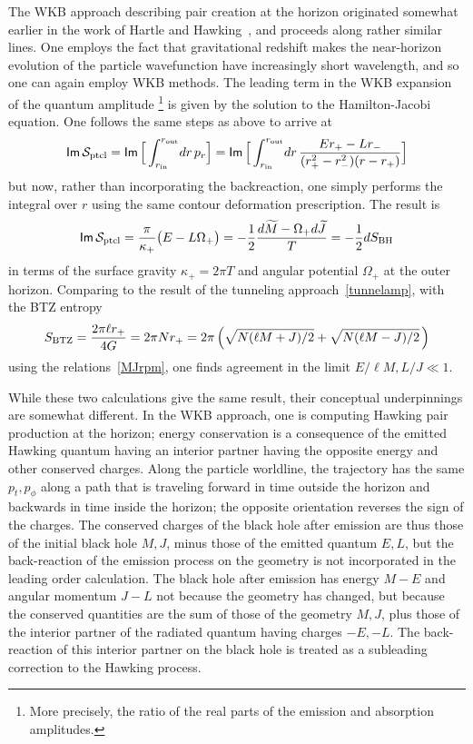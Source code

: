 \documentclass[11pt]{article}
\newcommand{\rcite}{\cite}
\def\Mtil{{\widetilde M}}
\def\Jtil{{\widetilde J}}
\def\ptcl{{\rm ptcl}}
\def\BH{{\rm BH}}
\def\BTZ{{\rm BTZ}}
\def\sfI{{\mathsf I}}
\def\sfm{{\mathsf m}}
\def\half{\frac12}
\def\Im{{\sfI\sfm\,}}
\def\be{\begin{equation}}
\def\ee{\end{equation}}
\numberwithin{equation}{section}
\def\cS{\mathcal {S}} \def\cT{\mathcal {T}} \def\cU{\mathcal {U}}
\def\half{\frac12}
\begin{document}
The WKB approach describing pair creation at the horizon originated somewhat earlier in the work of Hartle and Hawking~\rcite{Hartle:1976tp}, and proceeds along rather similar lines.  One employs the fact that gravitational redshift makes the near-horizon evolution of the particle wavefunction have increasingly short wavelength, and so one can again employ WKB methods.  The leading term in the WKB expansion of the quantum amplitude%
\footnote{More precisely, the ratio of the real parts of the emission and absorption amplitudes.} 
is given by the solution to the Hamilton-Jacobi equation.
One follows the same steps as above to arrive at
\be
\label{ImSagain}
\Im \cS_\ptcl = \Im \Big[ \int_{r_{\rm in}}^{r_{\rm out}} \! dr \, p_r  \Big] 
= \Im \Big[\int_{r_{\rm in}}^{r_{\rm out}} \! dr \, \frac{E  r_+ - L  r_- }{(r_+^2-r_-^2)(r-r_+)}  \Big] 
\ee
but now, rather than incorporating the backreaction, one simply performs the integral over $r$ using the same contour deformation prescription.  The result is
\be
\label{ImSptclWKB}
\Im \cS_\ptcl = \frac{\pi}{\kappa_+}\big( E  - L \Omega_+\big) = -\half\frac{d \Mtil -\Omega_+ d \Jtil }{T}  =  -\half  {d S_\BH} 
\ee
in terms of the surface gravity $\kappa_+=2\pi T$ and angular potential $\Omega_+$ at the outer horizon.
Comparing to the result of the tunneling approach~\eqref{tunnelamp}, with the BTZ entropy
\be
\label{BTZent}
S_\BTZ = \frac{2\pi \ell r_+}{4G} = 2\pi N r_+ = 2\pi\left( \sqrt{N(\ell M+J)/2} + \sqrt{ N (\ell M-J)/2} \, \right)  
\ee
using the relations~\eqref{MJrpm}, one finds agreement in the limit ${E }/{\ell M},{L }/{J}\ll1$.

While these two calculations give the same result, their conceptual underpinnings are somewhat different.  In the WKB approach, one is computing Hawking pair production at the horizon; energy conservation is a consequence of the emitted Hawking quantum having an interior partner having the opposite energy and other conserved charges.  Along the particle worldline, the trajectory has the same $p_t,p_\phi$ along a path that is traveling forward in time outside the horizon and backwards in time inside the horizon; the opposite orientation reverses the sign of the charges.  The conserved charges of the black hole after emission are thus those of the initial black hole $M,J$, minus those of the emitted quantum $E ,L $, but the back-reaction of the emission process on the geometry is not incorporated in the leading order calculation.  The black hole after emission has energy $M-E $ and angular momentum $J-L $ not because the geometry has changed, but because the conserved quantities are the sum of those of the geometry $M,J$, plus those of the interior partner of the radiated quantum having charges $-E ,-L $.  The back-reaction of this interior partner on the black hole is treated as a subleading correction to the Hawking process.
\end{document}
